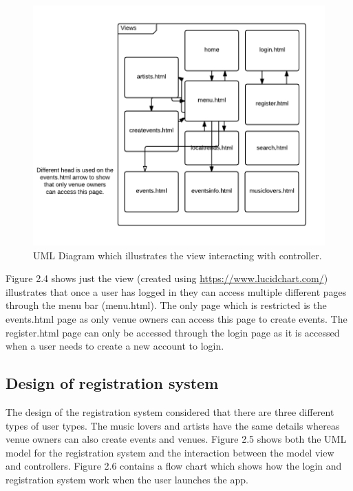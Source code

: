 \begin{figure}[H]
\includegraphics[width=\textwidth,height=\textheight,keepaspectratio]{images/va}
\caption{UML Diagram which illustrates the view interacting with controller.}
\end{figure}
Figure 2.4 shows just the view (created using \url{https://www.lucidchart.com/}) illustrates that once a user has logged in they can access multiple different pages through the menu bar (menu.html). The only page which is restricted is the events.html page as only venue owners can access this page to create events. The register.html page can only be accessed through the login page as it is accessed when a user needs to create a new account to login.

\subsection{Design of registration system}
The design of the registration system considered that there are three different types of user types. The music lovers and artists have the same details whereas venue owners can also create events and venues. Figure 2.5 shows both the UML model for the registration system and the interaction between the model view and controllers. Figure 2.6  contains a flow chart which shows how the login and registration system work when the user launches the app.

